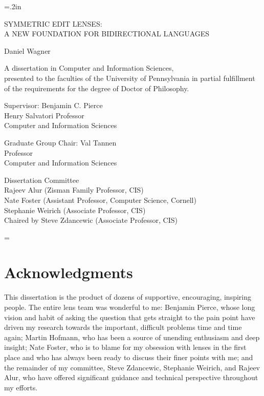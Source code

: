 \documentclass[12pt]{report}
\numberwithin{equation}{section}
\def\thetitle{\uppercase{Symmetric Edit Lenses:\\A New Foundation For Bidirectional Languages}}
\def\theauthor{Daniel Wagner}
\def\theadvisor{Benjamin C. Pierce}
\def\theyear{2014}
\begin{document}
\doublespacing
\large\newlength{\oldparskip}\setlength\oldparskip{\parskip}\parskip=.2in
\thispagestyle{empty}
\vspace*{\fill}
\begin{center}
\thetitle

\theauthor

\singlespacing
A dissertation in Computer and Information Sciences, \\
presented to the faculties of the University of Pennsylvania in partial
fulfillment of the requirements for the degree of Doctor of Philosophy.

\doublespacing
\theyear
\end{center}

\vspace*{3ex}

\singlespacing
\noindent\makebox[0in][l]{\rule[2ex]{3.5in}{.3mm}}%
Supervisor: \theadvisor \\
Henry Salvatori Professor \\
Computer and Information Sciences

\vspace*{4ex}

\noindent\makebox[0in][l]{\rule[2ex]{3.5in}{.3mm}}%
Graduate Group Chair: Val Tannen \\
Professor \\
Computer and Information Sciences

\vspace*{2ex}

\noindent Dissertation Committee \\
Rajeev Alur (Zisman Family Professor, CIS) \\
Nate Foster (Assistant Professor, Computer Science, Cornell) \\
Stephanie Weirich (Associate Professor, CIS) \\
Chaired by Steve Zdancewic (Associate Professor, CIS)
\vspace*{\fill}

\normalsize\parskip=\oldparskip


\newpage

\chapter*{Acknowledgments}

This dissertation is the product of dozens of supportive, encouraging,
inspiring people. The entire lens team was wonderful to me: Benjamin Pierce,
whose long vision and habit of asking the question that gets straight to the
pain point have driven my research towards the important, difficult problems
time and time again; Martin Hofmann, who has been a source of unending
enthusiasm and deep insight; Nate Foster, who is to blame for my obsession
with lenses in the first place and who has always been ready to discuss
their finer points with me; and the remainder of my committee, Steve
Zdancewic, Stephanie Weirich, and Rajeev Alur, who have offered significant
guidance and technical perspective throughout my efforts.
\end{document}
